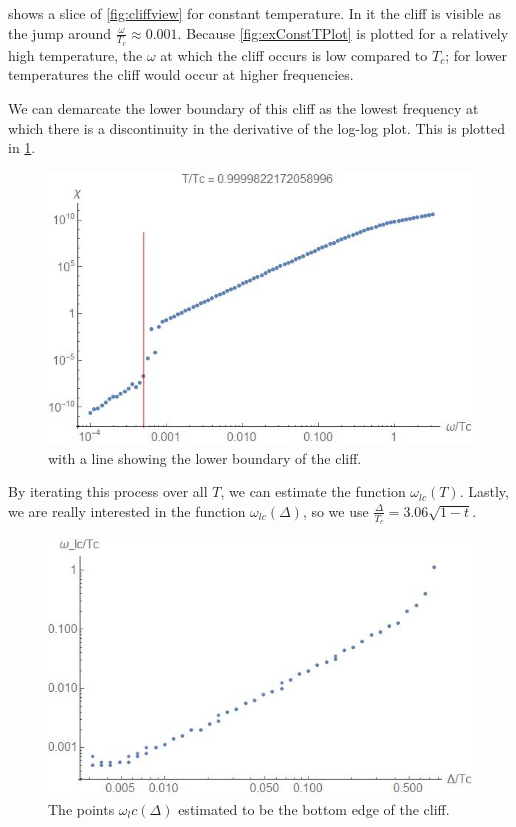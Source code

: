 \documentclass[%
 preprint,
 amsmath,amssymb,
 aps,
]{revtex4-2}
\begin{document}
 shows a slice of \cref{fig:cliffview} for constant temperature.
In it the cliff is visible as the jump around $\frac{\omega}{T_c} \approx 0.001$.
Because \cref{fig:exConstTPlot} is plotted for a relatively high temperature, the $\omega$ at which the cliff occurs is low compared to $T_c$;
for lower temperatures the cliff would occur at higher frequencies.

We can demarcate the lower boundary of this cliff as the lowest frequency at which there is a discontinuity in the derivative of the log-log plot.
This is plotted in \cref{fig:exConstTPlotWithLine}.

\begin{figure}[htp]
	\centering
	\includegraphics[width=\linewidth]{exampleconsttplotwithline}
	\caption{ with a line showing the lower boundary of the cliff.} \label{fig:exConstTPlotWithLine}
\end{figure}

By iterating this process over all $T$, we can estimate the function $\omega_{lc}(T)$.
Lastly, we are really interested in the function $\omega_{lc}(\Delta)$, so we use $\frac{\Delta}{T_c} = 3.06 \sqrt{1 - t}$.

\begin{figure}[htp]
	\centering
	\includegraphics[width=\linewidth]{cleancliff}
	\caption{The points $\omega_lc(\Delta)$ estimated to be the bottom edge of the cliff.} \label{fig:cleancliff}
\end{figure}
\end{document}
